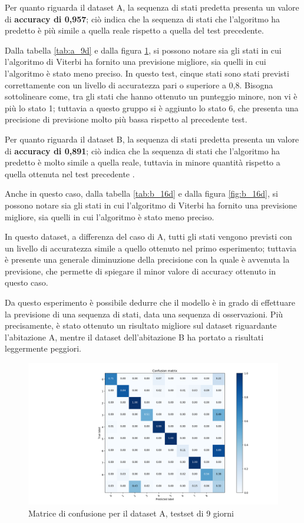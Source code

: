 \documentclass[10pt,a4paper]{article}
\begin{document}
	Per quanto riguarda il dataset A, la sequenza di stati predetta presenta un valore di \textbf{accuracy di 0,957}; ciò indica che la sequenza di stati che l'algoritmo ha predetto è più simile a quella reale rispetto a quella del test precedente.

	Dalla tabella \ref{tab:a_9d} e dalla figura \ref{fig:a_9d}, si possono notare sia gli stati in cui l'algoritmo di Viterbi ha fornito una previsione migliore, sia quelli in cui l'algoritmo è stato meno preciso. In questo test, cinque stati sono stati previsti correttamente con un livello di accuratezza pari o superiore a 0,8. Bisogna sottolineare come, tra gli stati che hanno ottenuto un punteggio minore, non vi è più lo stato 1; tuttavia a questo gruppo si è aggiunto lo stato 6, che presenta una precisione di previsione molto più bassa rispetto al precedente test.

    Per quanto riguarda il dataset B, la sequenza di stati predetta presenta un valore di \textbf{accuracy di 0,891}; ciò indica che la sequenza di stati che l'algoritmo ha predetto è molto simile a quella reale, tuttavia in minore quantità rispetto a quella ottenuta nel test precedente .

    Anche in questo caso, dalla tabella \ref{tab:b_16d} e dalla figura \ref{fig:b_16d}, si possono notare sia gli stati in cui l'algoritmo di Viterbi ha fornito una previsione migliore, sia quelli in cui l'algoritmo è stato meno preciso.

    In questo dataset, a differenza del caso di A, tutti gli stati vengono previsti con un livello di accuratezza simile a quello ottenuto nel primo esperimento; tuttavia è presente una generale diminuzione della precisione con la quale è avvenuta la previsione, che permette di spiegare il minor valore di accuracy ottenuto in questo caso.

    Da questo esperimento è possibile dedurre che il modello è in grado di effettuare la previsione di una sequenza di stati, data una sequenza di osservazioni. Più precisamente, è stato ottenuto un risultato migliore sul dataset riguardante l'abitazione A, mentre il dataset dell'abitazione B ha portato a risultati leggermente peggiori.



	\begin{figure}[!htbp]
	\includegraphics[width=\linewidth]{immagini/confusion_matrix/a_10d.png}
	\caption{Matrice di confusione per il dataset A, testset di 9 giorni}
	\label{fig:a_9d}
	\end{figure}
\end{document}
